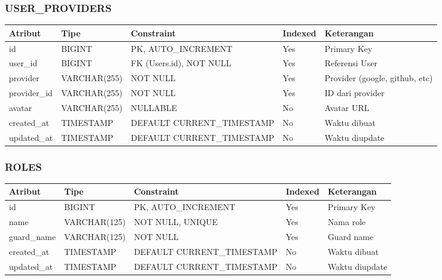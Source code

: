 \documentclass[12pt,a4paper]{article}
\begin{document}
\subsubsection{USER\_PROVIDERS}
\begin{tabularx}{\textwidth}{|l|l|l|l|X|}
\hline
\textbf{Atribut} & \textbf{Tipe} & \textbf{Constraint} & \textbf{Indexed} & \textbf{Keterangan} \\
\hline
id & BIGINT & PK, AUTO\_INCREMENT & Yes & Primary Key \\
\hline
user\_id & BIGINT & FK (Users.id), NOT NULL & Yes & Referensi User \\
\hline
provider & VARCHAR(255) & NOT NULL & Yes & Provider (google, github, etc) \\
\hline
provider\_id & VARCHAR(255) & NOT NULL & Yes & ID dari provider \\
\hline
avatar & VARCHAR(255) & NULLABLE & No & Avatar URL \\
\hline
created\_at & TIMESTAMP & DEFAULT CURRENT\_TIMESTAMP & No & Waktu dibuat \\
\hline
updated\_at & TIMESTAMP & DEFAULT CURRENT\_TIMESTAMP & No & Waktu diupdate \\
\hline
\end{tabularx}

\subsubsection{ROLES}
\begin{tabularx}{\textwidth}{|l|l|l|l|X|}
\hline
\textbf{Atribut} & \textbf{Tipe} & \textbf{Constraint} & \textbf{Indexed} & \textbf{Keterangan} \\
\hline
id & BIGINT & PK, AUTO\_INCREMENT & Yes & Primary Key \\
\hline
name & VARCHAR(125) & NOT NULL, UNIQUE & Yes & Nama role \\
\hline
guard\_name & VARCHAR(125) & NOT NULL & Yes & Guard name \\
\hline
created\_at & TIMESTAMP & DEFAULT CURRENT\_TIMESTAMP & No & Waktu dibuat \\
\hline
updated\_at & TIMESTAMP & DEFAULT CURRENT\_TIMESTAMP & No & Waktu diupdate \\
\hline
\end{tabularx}
\end{document}
